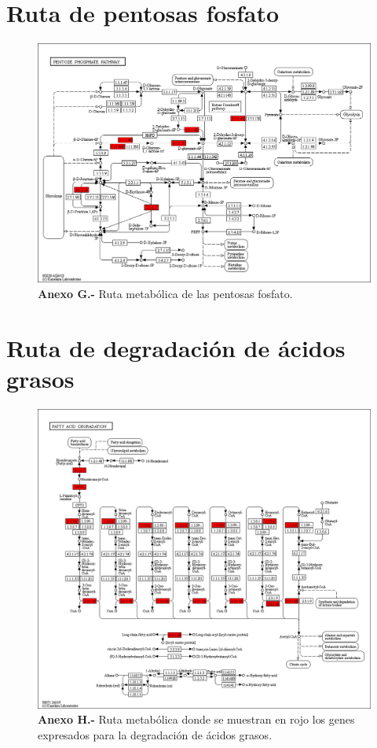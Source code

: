 \documentclass[12pt,letterpaper,oneside]{report}
\begin{document}
\chapter{Ruta de pentosas fosfato}
\begin{figure}[!h]
\centering
\centerline{\includegraphics[scale=0.5]{apendices/G-7}}
\caption*{\textbf{Anexo G.-} Ruta metabólica de las pentosas fosfato.}
\end{figure}
\chapter{Ruta de degradación de ácidos grasos}
\begin{figure}[!h]
\centerline{\includegraphics[scale=0.42]{apendices/H-8}}
\caption*{\textbf{Anexo H.-} Ruta metabólica donde se muestran en rojo los genes expresados para la degradación de ácidos grasos.}
\end{figure}
\end{document}
